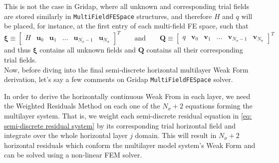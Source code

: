 \documentclass{article}
\newcommand{\Ns}{N_\sigma}
\begin{document}
This is not the case in Gridap, where all unknown and corresponding trial fields are stored similarly in   
\texttt{MultiFieldFESpace} structures, and therefore $H$ and $q$ will be placed, for instance, at the first entry of each multi-field FE space, such that
\begin{equation}
    \boldsymbol{\xi} \equiv \begin{bmatrix}
        H & \mathbf{u}_0 & \mathbf{u}_1 & \dots & \mathbf{u}_{\Ns-1} & \mathbf{u}_{\Ns}
    \end{bmatrix}^T \qquad  \text{and} \qquad \mathbf{Q} \equiv \begin{bmatrix}
        q & \mathbf{v}_0 & \mathbf{v}_1 & \dots & \mathbf{v}_{\Ns-1} & \mathbf{v}_{\Ns}
    \end{bmatrix}^T
    \label{eq: def xi and Q multifield FE spaces}
\end{equation}
and thus $\boldsymbol{\xi}$ contains all unknown fields and $\mathbf{Q}$ contains all their corresponding trial fields. \\

Now, before diving into the final semi-discrete horizontal multilayer Weak Form derivation, let's say a few comments on Gridap \texttt{MultiFieldFESpace} solver.

In order to derive the horizontally continuous Weak From in each layer, we need the Weighted Residuals Method on each one of the $\Ns+2$ equations forming the multilayer system. 
That is, we weight each semi-discrete residual equation in \eqref{eq: semi-discrete residual system} by its corresponding trial horizontal field and integrate over the whole horizontal layer $j$ domain.
This will result in $\Ns+2$ horizontal residuals which conform the multilayer model system's Weak Form and can be solved using a non-linear FEM solver. 
\end{document}
